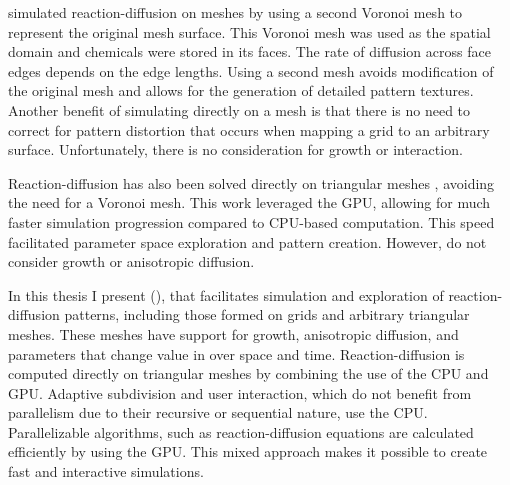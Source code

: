 \citet{turk1991} simulated reaction-diffusion on meshes by using a second Voronoi mesh to represent the original mesh surface. This Voronoi mesh was used as the spatial domain and chemicals were stored in its faces. The rate of diffusion across face edges depends on the edge lengths. Using a second mesh avoids modification of the original mesh and allows for the generation of detailed pattern textures. Another benefit of simulating directly on a mesh is that there is no need to correct for pattern distortion that occurs when mapping a grid to an arbitrary surface. Unfortunately, there is no consideration for growth or interaction. %

Reaction-diffusion has also been solved directly on triangular meshes \citep{descombes2016}, avoiding the need for a Voronoi mesh. This work leveraged the GPU, allowing for much faster simulation progression compared to CPU-based computation. This speed facilitated parameter space exploration and pattern creation. However, \citet{descombes2016} do not consider growth or anisotropic diffusion.

In this thesis I present  (\ProgramName{}), that facilitates simulation and exploration of reaction-diffusion patterns, including those formed on grids and arbitrary triangular meshes. These meshes have support for growth, anisotropic diffusion, and parameters that change value in over space and time. Reaction-diffusion is computed directly on triangular meshes by combining the use of the CPU and GPU. Adaptive subdivision and user interaction, which do not benefit from parallelism due to their recursive or sequential nature, use the CPU. Parallelizable algorithms, such as reaction-diffusion equations are calculated efficiently by using the GPU. This mixed approach makes it possible to create fast and interactive simulations. 

